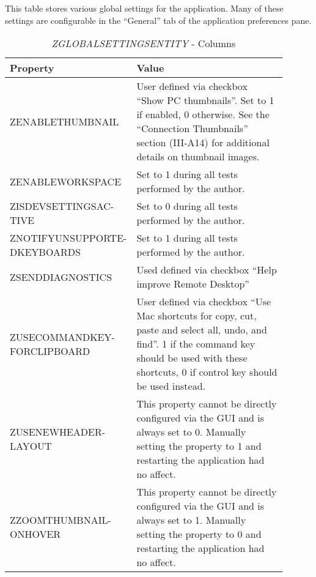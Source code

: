 \documentclass[journal]{IEEEtran}
\begin{document}
This table stores various global settings for the application. Many of these settings are configurable in the “General” tab of the application preferences pane.

\begin{table}[h!]
\caption{\textit{ZGLOBALSETTINGSENTITY} - Columns}
\begin{tabular}{p{0.35\linewidth} | p{0.55\linewidth}}
Property                    & Value                                                                                                                                                                                                 \\ \hline
ZENABLETHUMBNAIL            & User defined via checkbox “Show PC thumbnails”. Set to 1 if enabled, 0 otherwise. See the “Connection Thumbnails” section (III-A14) for additional details on thumbnail images.                                 \\
ZENABLEWORKSPACE            & Set to 1 during all tests performed by the author.                                                                                                                                                    \\
ZISDEVSETTINGSAC- TIVE        & Set to 0 during all tests performed by the author.                                                                                                                                                    \\
ZNOTIFYUNSUPPORTE- DKEYBOARDS & Set to 1 during all tests performed by the author.                                                                                                                                                    \\
ZSENDDIAGNOSTICS            & Used defined via checkbox “Help improve Remote Desktop”                                                                                                                                               \\
ZUSECOMMANDKEY- FORCLIPBOARD  & User defined via checkbox “Use Mac shortcuts for copy, cut, paste and select all, undo, and find”. 1 if the command key should be used with these shortcuts, 0 if control key should be used instead. \\
ZUSENEWHEADER- LAYOUT         & This property cannot be directly configured via the GUI and is always set to 0. Manually setting the property to 1 and restarting the application had no affect.                                      \\
ZZOOMTHUMBNAIL- ONHOVER       & This property cannot be directly configured via the GUI and is always set to 1. Manually setting the property to 0 and restarting the application had no affect.                                     
\end{tabular}
\end{table}
\end{document}

